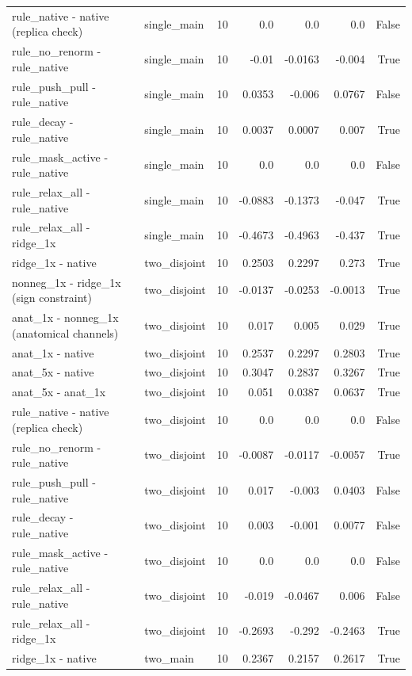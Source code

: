 \begin{table}[t]
\begin{tabular}{llrrrrr}
rule\_native - native (replica check) & single\_main & 10 & 0.0 & 0.0 & 0.0 & False \\
rule\_no\_renorm - rule\_native & single\_main & 10 & -0.01 & -0.0163 & -0.004 & True \\
rule\_push\_pull - rule\_native & single\_main & 10 & 0.0353 & -0.006 & 0.0767 & False \\
rule\_decay - rule\_native & single\_main & 10 & 0.0037 & 0.0007 & 0.007 & True \\
rule\_mask\_active - rule\_native & single\_main & 10 & 0.0 & 0.0 & 0.0 & False \\
rule\_relax\_all - rule\_native & single\_main & 10 & -0.0883 & -0.1373 & -0.047 & True \\
rule\_relax\_all - ridge\_1x & single\_main & 10 & -0.4673 & -0.4963 & -0.437 & True \\
ridge\_1x - native & two\_disjoint & 10 & 0.2503 & 0.2297 & 0.273 & True \\
nonneg\_1x - ridge\_1x (sign constraint) & two\_disjoint & 10 & -0.0137 & -0.0253 & -0.0013 & True \\
anat\_1x - nonneg\_1x (anatomical channels) & two\_disjoint & 10 & 0.017 & 0.005 & 0.029 & True \\
anat\_1x - native & two\_disjoint & 10 & 0.2537 & 0.2297 & 0.2803 & True \\
anat\_5x - native & two\_disjoint & 10 & 0.3047 & 0.2837 & 0.3267 & True \\
anat\_5x - anat\_1x & two\_disjoint & 10 & 0.051 & 0.0387 & 0.0637 & True \\
rule\_native - native (replica check) & two\_disjoint & 10 & 0.0 & 0.0 & 0.0 & False \\
rule\_no\_renorm - rule\_native & two\_disjoint & 10 & -0.0087 & -0.0117 & -0.0057 & True \\
rule\_push\_pull - rule\_native & two\_disjoint & 10 & 0.017 & -0.003 & 0.0403 & False \\
rule\_decay - rule\_native & two\_disjoint & 10 & 0.003 & -0.001 & 0.0077 & False \\
rule\_mask\_active - rule\_native & two\_disjoint & 10 & 0.0 & 0.0 & 0.0 & False \\
rule\_relax\_all - rule\_native & two\_disjoint & 10 & -0.019 & -0.0467 & 0.006 & False \\
rule\_relax\_all - ridge\_1x & two\_disjoint & 10 & -0.2693 & -0.292 & -0.2463 & True \\
ridge\_1x - native & two\_main & 10 & 0.2367 & 0.2157 & 0.2617 & True \\

\end{tabular}
\end{table}
